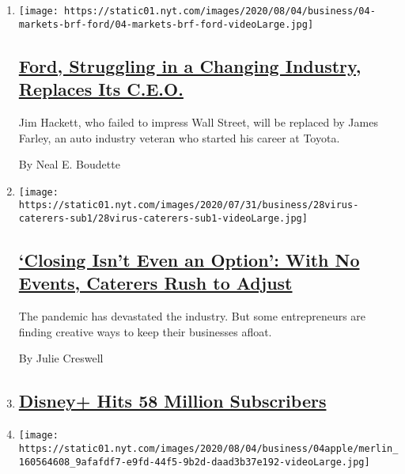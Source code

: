 \begin{enumerate}
\def\labelenumi{\arabic{enumi}.}
\item
  \texttt{[image: https://static01.nyt.com/images/2020/08/04/business/04-markets-brf-ford/04-markets-brf-ford-videoLarge.jpg]}

  \hypertarget{ford-struggling-in-a-changing-industry-replaces-its-ceo}{%
  \subsection{\texorpdfstring{\href{/2020/08/04/business/ford-jim-hackett-james-farley.html}{Ford,
  Struggling in a Changing Industry, Replaces Its
  C.E.O.}}{Ford, Struggling in a Changing Industry, Replaces Its C.E.O.}}\label{ford-struggling-in-a-changing-industry-replaces-its-ceo}}

  Jim Hackett, who failed to impress Wall Street, will be replaced by
  James Farley, an auto industry veteran who started his career at
  Toyota.

  By Neal E. Boudette
\item
  \texttt{[image: https://static01.nyt.com/images/2020/07/31/business/28virus-caterers-sub1/28virus-caterers-sub1-videoLarge.jpg]}

  \hypertarget{closing-isnt-even-an-option-with-no-events-caterers-rush-to-adjust}{%
  \subsection{\texorpdfstring{\href{/2020/08/04/business/coronavirus-struggling-caterers.html}{`Closing
  Isn't Even an Option': With No Events, Caterers Rush to
  Adjust}}{`Closing Isn't Even an Option': With No Events, Caterers Rush to Adjust}}\label{closing-isnt-even-an-option-with-no-events-caterers-rush-to-adjust}}

  The pandemic has devastated the industry. But some entrepreneurs are
  finding creative ways to keep their businesses afloat.

  By Julie Creswell
\item
  \hypertarget{disney-hits-58-million-subscribers}{%
  \subsection{\texorpdfstring{\href{https://www.nytimes.com/live/2020/08/04/business/stock-market-today-coronavirus}{Disney+
  Hits 58 Million
  Subscribers}}{Disney+ Hits 58 Million Subscribers}}\label{disney-hits-58-million-subscribers}}
\item
  \texttt{[image: https://static01.nyt.com/images/2020/08/04/business/04apple/merlin\_160564608\_9afafdf7-e9fd-44f5-9b2d-daad3b37e192-videoLarge.jpg]}


\end{enumerate}
